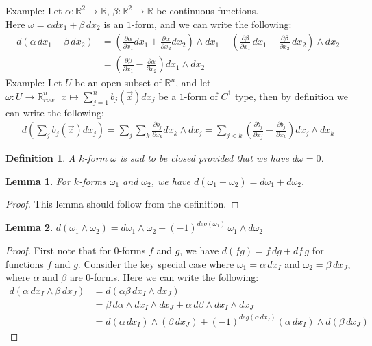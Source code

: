 \documentclass[15pt]{book}
\theoremstyle{break}
\theoremstyle{break}
\newtheorem{lem}{Lemma}[thm]
\newtheorem{defn}{Definition}[corL]
\newcommand{\R}{\mathbb{R}}
\newcommand{\pd}{\partial}
\newcommand{\lr}[1]{\left(#1\right)}
\newcommand{\example}{\color{green}Example: \color{black}}
\begin{document}
\example
Let $\alpha:\R^2 \to \R$, $\beta:\R^2 \to \R$ be continuous functions.\\ 
Here $\omega = \alpha dx_1 + \beta \, dx_2$ is an $1$-form, and we can write the following:
\begin{align*}
d\left(\alpha\, dx_1+ \beta \, dx_2\right) &= \left(\frac{\partial \alpha}{\partial x_1}dx_1 + \frac{\partial \alpha}{\partial x_2}dx_2 \right)\wedge dx_1 + \left(\frac{\partial \beta}{\partial x_1}\, dx_1 + \frac{\partial \beta}{\partial x_2}\, dx_2 \right)\wedge dx_2 \\
&= \left( \frac{\partial \beta}{\partial x_1} - \frac{\partial \alpha}{\partial x_2}\right) dx_1\wedge dx_2
\end{align*}
\example Let $U$ be an open subset of $\R^n$, and let $\omega:U \to \R^n_{row} \ \ \ x\mapsto \sum_{j=1}^n b_j(\vec{x}) dx_j$ be a $1$-form of $C^1$ type, then by definition we can write the following:
\begin{align*}
d\lr{\sum_j b_j(\vec{x}) dx_j} = \sum_j \sum_k \frac{\pd b_j}{\pd x_k}dx_k \wedge dx_j = \sum_{j<k}\lr{\frac{\pd b_j}{\pd x_j} - \frac{\pd b_j}{\pd x_k}} dx_j \wedge dx_k
\end{align*}

\begin{defn}
A $k$-form $\omega$ is sad to be closed provided that we have $d\omega = 0$.
\end{defn}

\begin{lem}
For $k$-forms $\omega_1$ and $\omega_2$, we have $d(\omega_1 + \omega_2) = d\omega_1 + d\omega_2$.
\end{lem}
\begin{proof}
This lemma should follow from the definition.
\end{proof}

\begin{lem}
$d(\omega_1 \wedge \omega_2) = d\omega_1 \wedge \omega_2 +(-1)^{deg(\omega_1)}\, \omega_1\wedge d\omega_2$
\end{lem}
\begin{proof}
First note that for $0$-forms $f$ and $g$, we have $d(fg) = f\, dg+ df\, g$ for functions $f$ and $g$. Consider the key special case where $\omega_1 = \alpha\, dx_I$ and $\omega_2 = \beta\, dx_J$, where $\alpha$ and $\beta$ are $0$-forms. Here we can write the following:
\begin{align*}
d(\alpha\, dx_I \wedge \beta\, dx_J) &= d(\alpha\beta \, dx_I \wedge dx_J)  \\
&=  \beta \, d\alpha \wedge dx_I \wedge dx_J + \alpha\, d\beta \wedge dx_I \wedge dx_J \\
&= d(\alpha\, dx_I) \wedge (\beta\, dx_J) + (-1)^{deg(\alpha \, dx_I)} ( \alpha \, dx_I)\wedge d(\beta\, dx_J) 
\end{align*}
\end{proof} 
\end{document}
